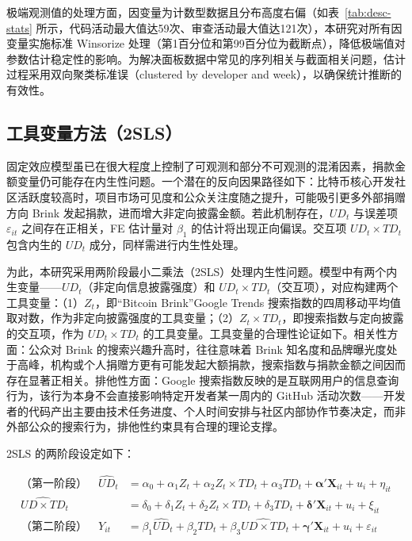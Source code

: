 \documentclass[
    type = master, %
    degree = professional,        %
    decl-page,  %
    twoside,                %
    fontset = fandol %
  ]{njuthesis}
\begin{document}
极端观测值的处理方面，因变量为计数型数据且分布高度右偏（如表~\ref{tab:desc-stats} 所示，代码活动最大值达59次、审查活动最大值达121次），本研究对所有因变量实施标准 Winsorize 处理（第1百分位和第99百分位为截断点），降低极端值对参数估计稳定性的影响。为解决面板数据中常见的序列相关与截面相关问题，估计过程采用双向聚类标准误（clustered by developer and week），以确保统计推断的有效性。

\subsection{工具变量方法（2SLS）}
\label{sec:iv-method}

固定效应模型虽已在很大程度上控制了可观测和部分不可观测的混淆因素，捐款金额变量仍可能存在内生性问题。一个潜在的反向因果路径如下：比特币核心开发社区活跃度较高时，项目市场可见度和公众关注度随之提升，可能吸引更多外部捐赠方向 Brink 发起捐款，进而增大非定向披露金额。若此机制存在，$UD_t$ 与误差项 $\varepsilon_{it}$ 之间存在正相关，FE 估计量对 $\beta_1$ 的估计将出现正向偏误。交互项 $UD_t \times TD_t$ 包含内生的 $UD_t$ 成分，同样需进行内生性处理。

为此，本研究采用两阶段最小二乘法（2SLS）处理内生性问题。模型中有两个内生变量——$UD_t$（非定向信息披露强度）和 $UD_t \times TD_t$（交互项），对应构建两个工具变量：（1）$Z_t$，即“Bitcoin Brink”Google Trends 搜索指数的四周移动平均值取对数，作为非定向披露强度的工具变量；（2）$Z_t \times TD_t$，即搜索指数与定向披露的交互项，作为 $UD_t \times TD_t$ 的工具变量。工具变量的合理性论证如下。相关性方面：公众对 Brink 的搜索兴趣升高时，往往意味着 Brink 知名度和品牌曝光度处于高峰，机构或个人捐赠方更有可能发起大额捐款，搜索指数与捐款金额之间因而存在显著正相关。排他性方面：Google 搜索指数反映的是互联网用户的信息查询行为，该行为本身不会直接影响特定开发者某一周内的 GitHub 活动次数——开发者的代码产出主要由技术任务进度、个人时间安排与社区内部协作节奏决定，而非外部公众的搜索行为，排他性约束具有合理的理论支撑。

2SLS 的两阶段设定如下：

\begin{align}
\text{（第一阶段）}\quad
    \widehat{UD}_t
        &= \alpha_0 + \alpha_1 Z_t
           + \alpha_2 Z_t \times TD_t
           + \alpha_3 TD_t
           + \boldsymbol{\alpha}' \mathbf{X}_{it} + u_i + \eta_{it}
\label{eq:first-stage} \\[0.5em]
    \widehat{UD \times TD}_t
        &= \delta_0 + \delta_1 Z_t
           + \delta_2 Z_t \times TD_t
           + \delta_3 TD_t
           + \boldsymbol{\delta}' \mathbf{X}_{it} + u_i + \xi_{it}
\label{eq:first-stage-2} \\[0.5em]
\text{（第二阶段）}\quad
    Y_{it}
        &= \beta_1 \widehat{UD}_t
           + \beta_2 TD_t
           + \beta_3 \widehat{UD \times TD}_t
           + \boldsymbol{\gamma}' \mathbf{X}_{it}
           + u_i + \varepsilon_{it}
\label{eq:second-stage}
\end{align}
\end{document}
